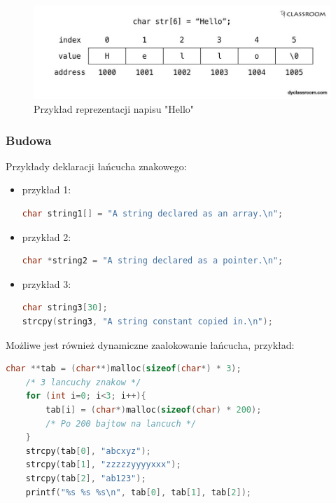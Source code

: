 \documentclass[a4paper,12pt,oneside]{book}
\begin{document}
				\begin{figure}[h!]
					\centering\includegraphics[scale=0.45]{example_string_c.jpg}
					\caption{Przykład reprezentacji napisu "Hello"}
				\end{figure}
			
				\subsubsection{Budowa}

					Przykłady deklaracji łańcucha znakowego:
					\begin{itemize}
						\item przykład 1:
						\begin{lstlisting}[language=C]
char string1[] = "A string declared as an array.\n";
						\end{lstlisting}
						\item przykład 2:
						\begin{lstlisting}[language=C]
char *string2 = "A string declared as a pointer.\n";	
						\end{lstlisting}
						\item przykład 3:
						\begin{lstlisting}[language=C]
char string3[30]; 
strcpy(string3, "A string constant copied in.\n");
						\end{lstlisting}
					\end{itemize}
					\newpage
					Możliwe jest również dynamiczne zaalokowanie łańcucha, przykład:
					\begin{lstlisting}[language=C]
	char **tab = (char**)malloc(sizeof(char*) * 3); 
	/* 3 lancuchy znakow */
	for (int i=0; i<3; i++){ 
	    tab[i] = (char*)malloc(sizeof(char) * 200);
	    /* Po 200 bajtow na lancuch */
	} 
	strcpy(tab[0], "abcxyz"); 
	strcpy(tab[1], "zzzzzyyyyxxx"); 
	strcpy(tab[2], "ab123"); 
	printf("%s %s %s\n", tab[0], tab[1], tab[2]); 
					\end{lstlisting}
			
\end{document}
